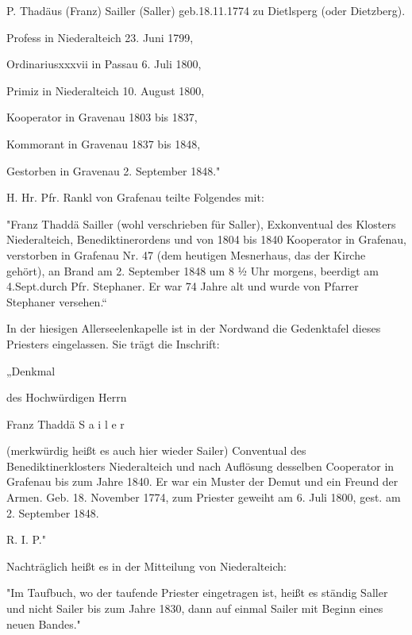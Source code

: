 P. Thadäus (Franz) Sailler (Saller) geb.18.11.1774 zu Dietlsperg (oder
Dietzberg).

Profess in Niederalteich 23. Juni 1799,

Ordinariusxxxvii in  Passau 6. Juli 1800,

Primiz in Niederalteich 10. August 1800,

Kooperator in Gravenau 1803 bis 1837,

Kommorant in Gravenau 1837 bis 1848,

Gestorben in Gravenau 2. September 1848."



H. Hr. Pfr. Rankl von Grafenau teilte Folgendes mit:



"Franz Thaddä Sailler (wohl verschrieben für Saller), Exkonventual des Klosters
Niederalteich, Benediktinerordens und von 1804 bis 1840 Kooperator in Grafenau,
verstorben in Grafenau Nr. 47 (dem heutigen Mesnerhaus, das der Kirche gehört),
an Brand am 2. September 1848 um 8 ½ Uhr morgens, beerdigt am 4.Sept.durch Pfr.
Stephaner. Er war 74 Jahre alt und wurde von Pfarrer Stephaner versehen.“



In der hiesigen Allerseelenkapelle ist in der Nordwand die Gedenktafel dieses
Priesters eingelassen. Sie trägt die Inschrift:



„Denkmal

des Hochwürdigen Herrn

Franz Thaddä S a i l e r

(merkwürdig heißt es auch hier wieder Sailer) Conventual des
Benediktinerklosters Niederalteich und nach Auflösung desselben Cooperator in
Grafenau bis zum Jahre 1840. Er war ein Muster der Demut und ein Freund der
Armen. Geb. 18. November 1774, zum Priester geweiht am 6. Juli 1800, gest. am 2.
September 1848.

R. I. P."



Nachträglich heißt es in der Mitteilung von Niederalteich:



"Im Taufbuch, wo der taufende Priester eingetragen ist, heißt es ständig Saller
und nicht Sailer bis zum Jahre 1830, dann auf einmal Sailer mit Beginn eines
neuen Bandes."



